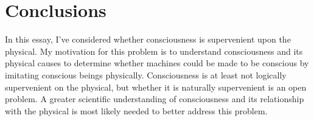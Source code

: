 \documentclass{article}
\begin{document}
\section*{Conclusions}

In this essay, I've considered whether consciousness is supervenient upon the physical. My motivation for this problem is to understand consciousness and its physical causes to determine whether machines could be made to be conscious by imitating conscious beings physically. Consciousness is at least not logically supervenient on the physical, but whether it is naturally supervenient is an open problem. A greater scientific understanding of consciousness and its relationship with the physical is most likely needed to better address this problem.






\end{document}
